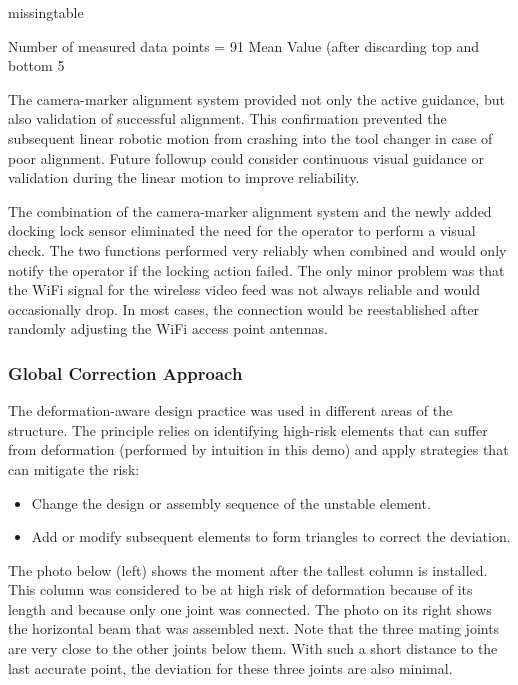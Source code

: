 missingtable

Number of measured data points = 91
Mean Value (after discarding top and bottom 5%

The camera-marker alignment system provided not only the active guidance, but also validation of successful alignment. This confirmation prevented the subsequent linear robotic motion from crashing into the tool changer in case of poor alignment. Future followup could consider continuous visual guidance or validation during the linear motion to improve reliability.

The combination of the camera-marker alignment system and the newly added docking lock sensor eliminated the need for the operator to perform a visual check. The two functions performed very reliably when combined and would only notify the operator if the locking action failed. The only minor problem was that the WiFi signal for the wireless video feed was not always reliable and would occasionally drop. In most cases, the connection would be reestablished after randomly adjusting the WiFi access point antennas. 

\subsubsection{Global Correction Approach}
\label{subsubsection:exploration_4_global_correction_approach}

The deformation-aware design practice was used in different areas of the structure. The principle relies on identifying high-risk elements that can suffer from deformation (performed by intuition in this demo) and apply strategies that can mitigate the risk:
\begin{itemize}
    \item Change the design or assembly sequence of the unstable element.
    \item Add or modify subsequent elements to form triangles to correct the deviation.
\end{itemize}

The photo below (left) shows the moment after the tallest column is installed. This column was considered to be at high risk of deformation because of its length and because only one joint was connected. The photo on its right shows the horizontal beam that was assembled next. Note that the three mating joints are very close to the other joints below them. With such a short distance to the last accurate point, the deviation for these three joints are also minimal. 


